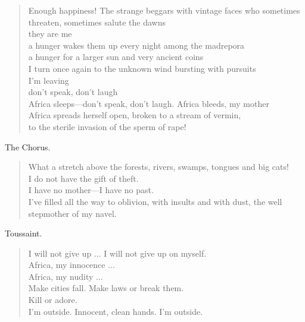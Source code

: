 \documentclass[letterpaper,article,12pt,oneside,notitlepage]{memoir}
\begin{document}
\begin{verse}
Enough happiness! The strange beggars with vintage faces who sometimes threaten, sometimes salute the dawns \\
they are me \\
a hunger wakes them up every night among the madrepora \\
a hunger for a larger sun and very ancient coins \\
I turn once again to the unknown wind bursting with pursuits \\
I'm leaving \\
don't speak, don't laugh \\
Africa sleeps---don't speak, don't laugh. Africa bleeds, my mother \\
Africa spreads herself open, broken to a stream of vermin, \\
to the sterile invasion of the sperm of rape! \\
\end{verse}

\begin{center}The Chorus.\end{center}

\begin{verse}
What a stretch above the forests, rivers, swamps, tongues and big cats! \\
I do not have the gift of theft. \\
I have no mother---I have no past. \\
I've filled all the way to oblivion, with insults and with dust, the well \\
stepmother of my navel. \\
\end{verse}

\begin{center}Toussaint.\end{center}

\begin{verse}
\hspace{1cm} I will not give up ... I will not give up on myself. \\
Africa, my innocence ... \\
Africa, my nudity ... \\
Make cities fall. Make laws or break them. \\
Kill or adore. \\
I'm outside. Innocent, clean hands. I'm outside. \\
\end{verse}
\end{document}
